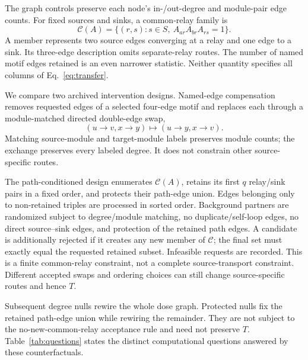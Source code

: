 The graph controls preserve each node's in-/out-degree and module-pair
edge counts. For fixed sources and sinks, a common-relay family is
\begin{equation}
 \mathcal C(A)=\{(r,s):s\in S,\ A_{ar}A_{br}A_{rs}=1\}.
 \label{eq:paths}
\end{equation}
A member represents two source edges converging at a relay and one edge
to a sink. Its three-edge description omits separate-relay routes.
The number of named motif edges retained is an even narrower statistic.
Neither quantity specifies all columns of Eq.~\eqref{eq:transfer}.

We compare two archived intervention designs. Named-edge compensation
removes requested edges of a selected four-edge motif and replaces each
through a module-matched directed double-edge swap,
\begin{equation}
 (u\!\to\!v,x\!\to\!y)
 \longmapsto (u\!\to\!y,x\!\to\!v).
 \label{eq:swap}
\end{equation}
Matching source-module and target-module labels preserves module counts;
the exchange preserves every labeled degree. It does not constrain
other source-specific routes.

The path-conditioned design enumerates $\mathcal C(A)$, retains its first
$q$ relay/sink pairs in a fixed order, and protects their path-edge union.
Edges belonging only to non-retained triples are processed in sorted order.
Background partners are randomized subject to degree/module matching,
no duplicate/self-loop edges, no direct source--sink edges, and protection
of the retained path edges. A candidate is additionally rejected if it
creates any new member of $\mathcal C$; the final set must exactly equal
the requested retained subset. Infeasible requests are recorded.
This is a finite common-relay constraint, not a complete source-transport
constraint. Different accepted swaps and ordering choices can still
change source-specific routes and hence $T$.

Subsequent degree nulls rewire the whole dose graph. Protected nulls fix
the retained path-edge union while rewiring the remainder. They are not
subject to the no-new-common-relay acceptance rule and need not preserve
$T$. Table~\ref{tab:questions} states the distinct computational questions
answered by these counterfactuals.

